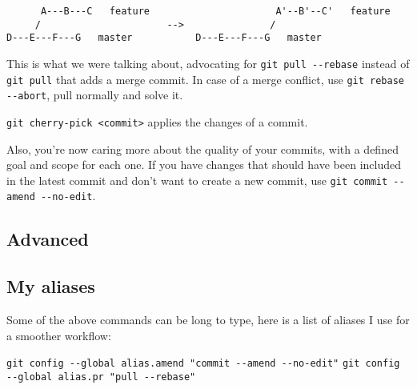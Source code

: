\begin{center}
\begin{verbatim}
      A---B---C   feature                      A'--B'--C'   feature
     /                      -->               /          
D---E---F---G   master           D---E---F---G   master   
\end{verbatim}
\end{center}

This is what we were talking about, advocating for \texttt{git pull -{}-rebase} instead of \texttt{git pull} that adds a merge commit. In case of a merge conflict, use \texttt{git rebase -{}-abort}, pull normally and solve it.

\texttt{git cherry-pick <commit>} applies the changes of a commit.

Also, you're now caring more about the quality of your commits, with a defined goal and scope for each one. If you have changes that should have been included in the latest commit and don't want to create a new commit, use \texttt{git commit -{}-amend -{}-no-edit}.


\subsection*{Advanced}

\subsection*{My aliases}

Some of the above commands can be long to type, here is a list of aliases I use for a smoother workflow:

\texttt{git config -{}-global alias.amend "commit -{}-amend -{}-no-edit"}
\texttt{git config -{}-global alias.pr "pull -{}-rebase"}